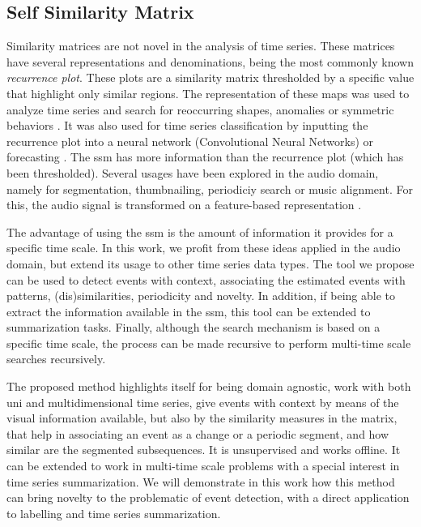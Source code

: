 \subsection{Self Similarity Matrix}

Similarity matrices are not novel in the analysis of time series. These matrices have several representations and denominations, being the most commonly known \textit{recurrence plot}. These plots are a similarity matrix thresholded by a specific value that highlight only similar regions. The representation of these maps was used to analyze time series \cite{eamonn_dotplots,recurrenceplots1} and search for reoccurring shapes, anomalies or symmetric behaviors \cite{eamonn_dotplots}. It was also used for time series classification by inputting the recurrence plot into a neural network (Convolutional Neural Networks) \cite{recurrenceplots1, recurrenceplots2} or forecasting \cite{recurrenceplots3}.
The \gls{ssm} has more information than the recurrence plot (which has been thresholded). Several usages have been explored in the audio domain, namely for segmentation, thumbnailing, periodiciy search or music alignment. For this, the audio signal is transformed on a feature-based representation \cite{fmp1, fmp2}. 

The advantage of using the \gls{ssm} is the amount of information it provides for a specific time scale. In this work, we profit from these ideas applied in the audio domain, but extend its usage to other time series data types. The tool we propose can be used to detect events with context, associating the estimated events with patterns, (dis)similarities, periodicity and novelty. In addition, if being able to extract the information available in the \gls{ssm}, this tool can be extended to summarization tasks. Finally, although the search mechanism is based on a specific time scale, the process can be made recursive to perform multi-time scale searches recursively.
\par
The proposed method highlights itself for being domain agnostic, work with both uni and multidimensional time series, give events with context by means of the visual information available, but also by the similarity measures in the matrix, that help in associating an event as a change or a periodic segment, and how similar are the segmented subsequences. It is unsupervised and works offline. It can be extended to work in multi-time scale problems with a special interest in time series summarization. We will demonstrate in this work how this method can bring novelty to the problematic of event detection, with a direct application to labelling and time series summarization.




